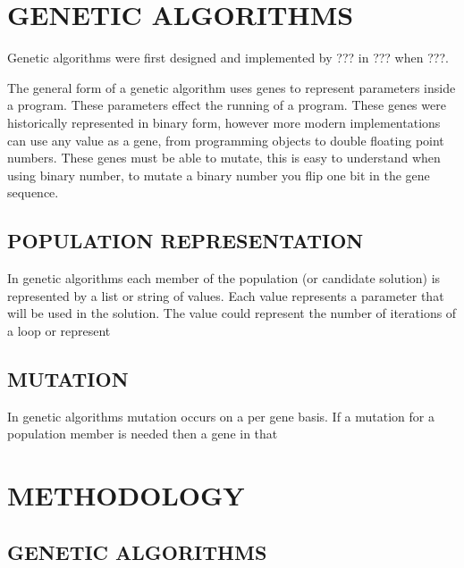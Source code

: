 \documentclass[10pt,twocolumn]{article}
\begin{document}
\paragraph{}

\section{GENETIC ALGORITHMS}

Genetic algorithms were first designed and implemented by ??? in ??? when ???.

The general form of a genetic algorithm uses genes to represent parameters inside a program.
These parameters effect the running of a program.
These genes were historically represented in binary form, however more modern implementations can use any value as a gene, from programming objects to double floating point numbers.
These genes must be able to mutate, this is easy to understand when using binary number, to mutate a binary number you flip one bit in the gene sequence. 

\subsection{POPULATION REPRESENTATION}
In genetic algorithms each member of the population (or candidate solution) is represented by a list or string of values. Each value represents a parameter that will be used in the solution. The value could represent the number of iterations of a loop or represent 

\subsection{MUTATION}
In genetic algorithms mutation occurs on a per gene basis. If a mutation for a population member is needed then a gene in that 


\section{METHODOLOGY}

\subsection{GENETIC ALGORITHMS}
\end{document}
